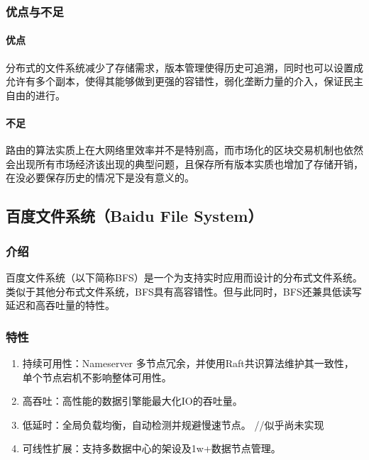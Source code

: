\documentclass{ctexart}
\begin{document}
\subsubsection{优点与不足}
\paragraph{优点}
分布式的文件系统减少了存储需求，版本管理使得历史可追溯，同时也可以设置成允许有多个副本，使得其能够做到更强的容错性，弱化垄断力量的介入，保证民主自由的进行。
\paragraph{不足}
路由的算法实质上在大网络里效率并不是特别高，而市场化的区块交易机制也依然会出现所有市场经济该出现的典型问题，且保存所有版本实质也增加了存储开销，在没必要保存历史的情况下是没有意义的。
\subsection{百度文件系统（Baidu File System）}
\subsubsection{介绍}
百度文件系统（以下简称BFS）是一个为支持实时应用而设计的分布式文件系统。类似于其他分布式文件系统，BFS具有高容错性。但与此同时，BFS还兼具低读写延迟和高吞吐量的特性。\cite{BFS}
\subsubsection{特性}
\begin{enumerate}
	\item 持续可用性：Nameserver 多节点冗余，并使用Raft共识算法维护其一致性，单个节点宕机不影响整体可用性。
	\item 高吞吐：高性能的数据引擎能最大化IO的吞吐量。
	\item 低延时：全局负载均衡，自动检测并规避慢速节点。 //似乎尚未实现
	\item 可线性扩展：支持多数据中心的架设及1w+数据节点管理。
\end{enumerate}
\end{document}
